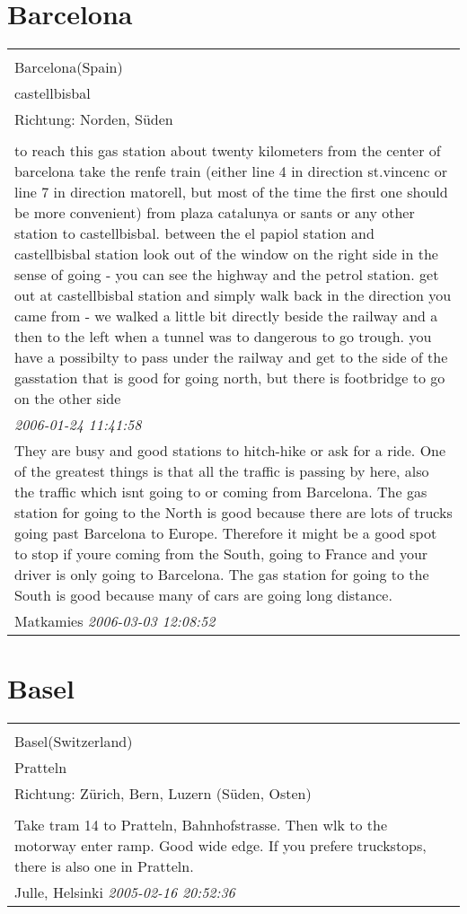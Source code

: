 \documentclass[a4paper,12pt]{article}
\begin{document}
\section{Barcelona}
\begin{tabular}{|p{13cm}|}
\hline\\
Barcelona(Spain)\\
castellbisbal\\
Richtung: Norden, Süden \\
\hline\\
to reach this gas station about twenty kilometers from the center of barcelona take the renfe train (either line 4 in direction st.vincenc or line 7 in direction matorell, but most of the time the first one should be more convenient) from plaza catalunya or sants or any other station to castellbisbal. between the el papiol station and castellbisbal station look out of the window on the right side in the sense of going - you can see the highway and the petrol station. get out at castellbisbal station and simply walk back in the direction you came from - we walked a little bit directly beside the railway and a then to the left when a tunnel was to dangerous to go trough. you have a possibilty to pass under the railway and get to the side of the gasstation that is good for going north, but there is footbridge to go on the other side \\
\textit{ 2006-01-24 11:41:58 }\\\hline They are busy and good stations to hitch-hike or ask for a ride. One of the greatest things is that all the traffic is passing by here, also the traffic which isnt going to or coming from Barcelona. The gas station for going to the North is good because there are lots of trucks going past Barcelona to Europe. Therefore it might be a good spot to stop if youre coming from the South, going to France and your driver is only going to Barcelona. The gas station for going to the South is good because many of cars are going long distance. \\
Matkamies \textit{ 2006-03-03 12:08:52 }\\\hline
\end{tabular}


\section{Basel}
\begin{tabular}{|p{13cm}|}
\hline\\
Basel(Switzerland)\\
Pratteln\\
Richtung: Zürich, Bern, Luzern (Süden, Osten) \\
\hline\\
Take tram 14 to Pratteln, Bahnhofstrasse. Then wlk to the motorway enter ramp. Good wide edge. If you prefere truckstops, there is also one in Pratteln. \\
Julle, Helsinki \textit{ 2005-02-16 20:52:36 }\\\hline
\end{tabular}
\end{document}
